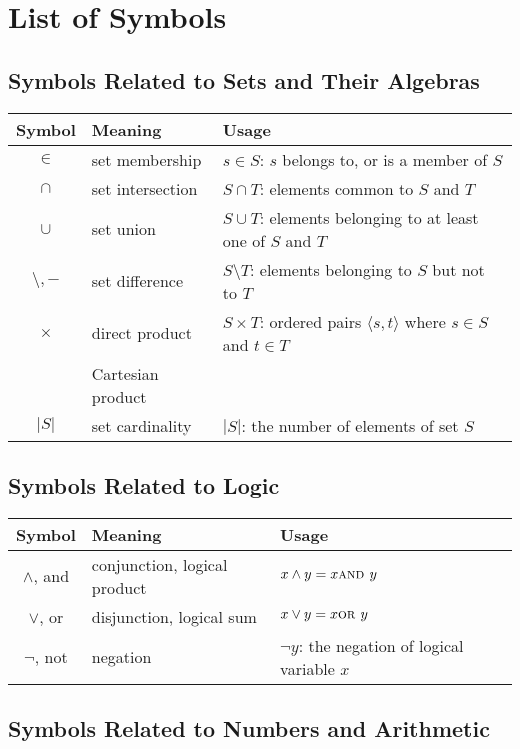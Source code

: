 
\chapter*{List of Symbols}

\section*{Symbols Related to Sets and Their Algebras}

\begin{tabular}{c|l|l}
{\bf Symbol} & {\bf Meaning} & {\bf Usage} \\ \hline
$\in$
  & set membership
  & $s \in S$: $s$ belongs to, or is a member of $S$ \\ \hline
$\cap$
  & set intersection
  & $S \cap T$: elements common to $S$ and $T$ \\ \hline
$\cup$
  & set union
  & $S \cup T$: elements belonging to at least one of $S$ and $T$ \\ \hline
$\setminus, -$
  & set difference 
  & $S \setminus T$: elements belonging to $S$ but not to $T$ \\ \hline
$\times$
  & direct product
  & $S \times T$: ordered pairs $\langle s,t \rangle$ where $s \in S$ and $t \in T$ \\
   & Cartesian product & \\ \hline
$|S|$
  & set cardinality
  & $|S|$: the number of elements of set $S$
\end{tabular}

\section*{Symbols Related to Logic}

\begin{tabular}{c|l|l}
{\bf Symbol} & {\bf Meaning} & {\bf Usage} \\ \hline
\hline
$\wedge$, {\sc and}
  & conjunction, logical product
  & $x \wedge y = x \mbox{\sc and } y$ \\ \hline
$\vee$, {\sc or}
  & disjunction, logical sum
  & $x \vee y = x \mbox{\sc or } y$ \\ \hline
$\neg$, {\sc not}
  & negation
  & $\neg y$: the negation of logical variable $x$
\end{tabular}

\section*{Symbols Related to Numbers and Arithmetic}

